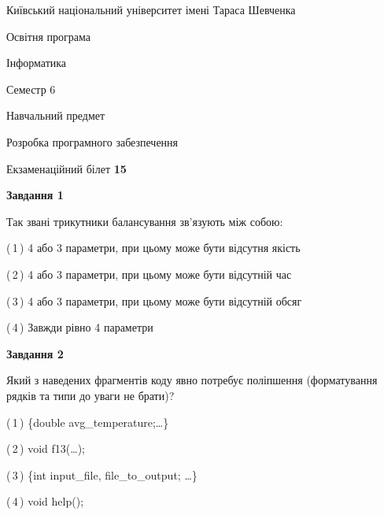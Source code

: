 \documentclass[10pt, ukrainian]{article}
\begin{document}
{{\begin {small}\par
{ \center  Київський національний університет імені Тараса Шевченка \par}
{\parbox {5 cm}{Освітня програма \hfill}{\parbox {7 cm}{Інформатика \hfill}}\parbox {6 cm}{\hfill Семестр 6}}\par
{\parbox {5 cm} {Навчальний предмет \hfill}\parbox {7 cm}{Розробка програмного забезпечення \hfill}\parbox {6cm}{\hfill}\par}\vspace{-7pt} \end{small}}{\center Екзаменаційний білет \No \textbf
{ 15 }\par}}
{
\begin {large}
{\begin {center}\textbf{Завдання 1}\end {center}}\par
Так звані трикутники балансування зв'язують між собою:\par
\vspace{2mm}



(\,1\,) 4 або 3 параметри, при цьому може бути відсутня якість%



(\,2\,) 4 або 3 параметри, при цьому може бути відсутній час%



(\,3\,) 4 або 3 параметри, при цьому може бути відсутній обсяг %



(\,4\,) Завжди рівно 4 параметри%


{\begin {center}\textbf{Завдання 2}\end {center}}\par
Який з наведених фрагментів коду явно потребує поліпшення (форматування рядків та типи до уваги не брати)?\par
\vspace{2mm}



(\,1\,) \{double avg\_temperature;…\} %



(\,2\,) void f13(…);%



(\,3\,) \{int input\_file, file\_to\_output; …\}%



(\,4\,) void help();%



\end{large}}
\end{document}
